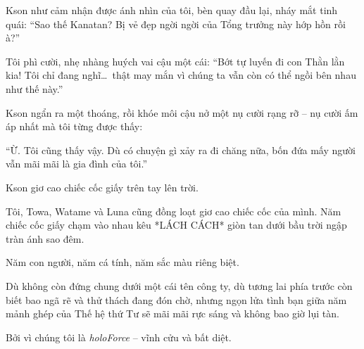 \documentclass[../main.tex]{subfiles}
\begin{document}
Kson như cảm nhận được ánh nhìn của tôi, bèn quay đầu lại, nháy mắt tinh quái: ``Sao thế Kanatan? Bị vẻ đẹp ngời ngời của Tổng trưởng này hớp hồn rồi à?''

Tôi phì cười, nhẹ nhàng huých vai cậu một cái: ``Bớt tự luyến đi con Thằn lằn kia! Tôi chỉ đang nghĩ\dots\ thật may mắn vì chúng ta vẫn còn có thể ngồi bên nhau như thế này.''

Kson ngẩn ra một thoáng, rồi khóe môi cậu nở một nụ cười rạng rỡ -- nụ cười ấm áp nhất mà tôi từng được thấy:

``Ừ. Tôi cũng thấy vậy. Dù có chuyện gì xảy ra đi chăng nữa, bốn đứa mấy người vẫn mãi mãi là gia đình của tôi.''

Kson giơ cao chiếc cốc giấy trên tay lên trời.

Tôi, Towa, Watame và Luna cũng đồng loạt giơ cao chiếc cốc của mình. Năm chiếc cốc giấy chạm vào nhau kêu *LÁCH CÁCH* giòn tan dưới bầu trời ngập tràn ánh sao đêm.

Năm con người, năm cá tính, năm sắc màu riêng biệt.

Dù không còn đứng chung dưới một cái tên công ty, dù tương lai phía trước còn biết bao ngã rẽ và thử thách đang đón chờ, nhưng ngọn lửa tình bạn giữa năm mảnh ghép của Thế hệ thứ Tư sẽ mãi mãi rực sáng và không bao giờ lụi tàn.

Bởi vì chúng tôi là \textit{holoForce} -- vĩnh cửu và bất diệt.
\end{document}
